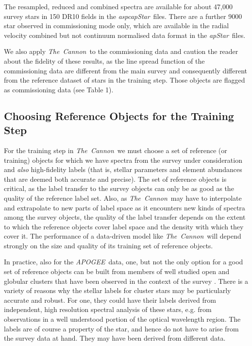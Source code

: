 \documentclass[12pt, preprint]{aastex}
\newcommand{\tc}{\textsl{The~Cannon}}
\newcommand{\apogee}{\textsl{APOGEE}}
\newcommand{\aspcapstar}{\textsl{aspcapStar}}
\newcommand{\apstar}{\textsl{apStar}}
\begin{document}
The resampled, reduced and combined spectra are available for about 47,000 survey stars in 150 DR10 fields in the \aspcapstar\ files. There are a further 9000 star observed in commissioning mode only, which are available in the radial velocity combined but not continuum normalised data format in the \apstar\ files.

We also apply \tc\ to the commissioning data and caution the reader about the fidelity of these results, as the line spread function of the commissioning data are different from the main survey and consequently different from the reference dataset of stars in the training step. Those objects are flagged as commissioning data (see Table 1).



\subsection{Choosing Reference Objects for the Training Step}
\label{sec:ReferenceObjects}

For the training step in \tc\ we must choose a set of reference (or training) objects for which we have spectra from the survey under consideration and \emph{also} high-fidelity labels (that is, stellar parameters and element abundances that are deemed both accurate and precise).
The set of reference objects is critical, as the label transfer to the survey objects can only be as good as the quality of the reference label set. 
Also, as \tc\ may have to interpolate and extrapolate to new parts of label space as
it encounters new kinds of spectra among the survey objects, the quality
of the label transfer depends on the extent to which the reference objects
cover label space and the density with which they cover it.
The performance of a data-driven model like \tc\ will depend strongly on the size and quality of its training set of reference objects.

In practice, also for the \apogee\ data, one, but not the only option for
a good set of reference objects can be built from 
members of well studied open and globular clusters that have been observed in the context of the survey \citep{Zaso2013}.
There is a variety of reasons why the stellar labels for cluster stars may be particularly accurate and robust.
For one, they could have their labels derived from independent, high resolution spectral analysis of these
stars, e.g. from observations in a well understood portion of the optical wavelength region. The
labels are of course a property of the
star, and hence do not have to arise from the survey data at hand. They may have been derived from different data.
\end{document}
